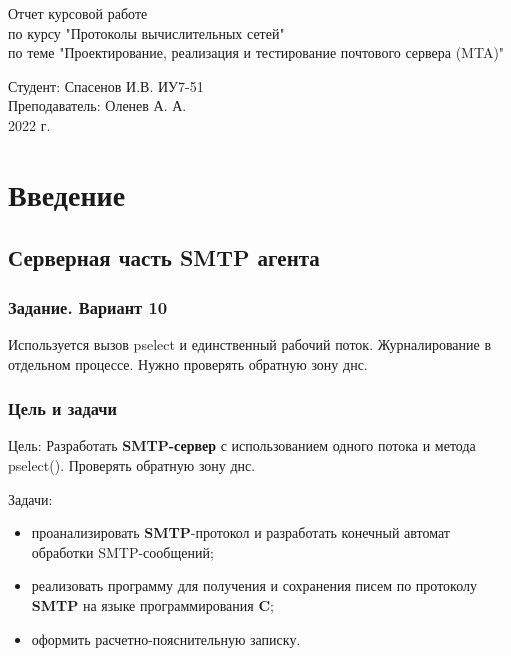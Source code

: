 \documentclass[a4paper,12pt]{report}
\begin{document}
	\begin{titlepage}
		\begin{center}
			\begin{LARGE}
				Отчет курсовой работе\\
					по курсу "Протоколы вычислительных сетей"\\
					по теме "Проектирование, реализация и тестирование почтового сервера (MTA)"
			\end{LARGE}
		
			\begin{Large}
				Студент: Спасенов И.В. ИУ7-51\\
					Преподаватель: Оленев А. А. \\
				
				\vspace{10cm}2022 г.				   
			\end{Large}
			
		\end{center}
		 
	\end{titlepage}

\tableofcontents

\chapter*{Введение}

\section*{Серверная часть SMTP агента}

\subsection*{Задание. Вариант 10}

Используется вызов pselect и единственный рабочий поток. Журналирование в отдельном процессе. Нужно проверять обратную зону днс.

\subsection*{Цель и задачи}

Цель:
    Разработать \textbf{SMTP-сервер} с использованием одного потока и метода pselect(). Проверять обратную зону днс.

Задачи:
\begin{itemize}
    \item проанализировать \textbf{SMTP}-протокол и разработать конечный автомат обработки SMTP-сообщений;
    \item реализовать программу для получения и сохранения писем по протоколу \textbf{SMTP} на языке программирования \textbf{C};
    \item оформить расчетно-пояснительную записку.
\end{itemize}
\end{document}

